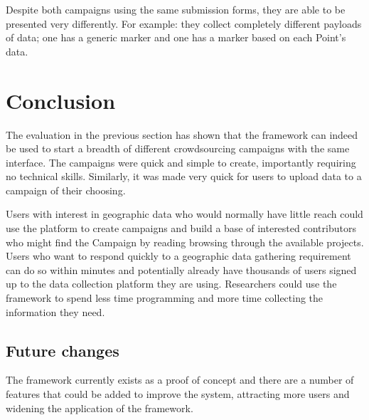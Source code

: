 \documentclass{article}
\newcommand\ssection{\clearpage\section}
\begin{document}
		Despite both campaigns using the same submission forms, they are able to be presented very differently. For example: they collect completely different payloads of data; one has a generic marker and one has a marker based on each Point's data.

	\ssection{Conclusion}
	\label{sec:conclusion}

		The evaluation in the previous section has shown that the framework can indeed be used to start a breadth of different crowdsourcing campaigns with the same interface. The campaigns were quick and simple to create, importantly requiring no technical skills. Similarly, it was made very quick for users to upload data to a campaign of their choosing.

		Users with interest in geographic data who would normally have little reach could use the platform to create campaigns and build a base of interested contributors who might find the Campaign by reading browsing through the available projects. Users who want to respond quickly to a geographic data gathering requirement can do so within minutes and potentially already have thousands of users signed up to the data collection platform they are using. Researchers could use the framework to spend less time programming and more time collecting the information they need.

		\subsection{Future changes}

		The framework currently exists as a proof of concept and there are a number of features that could be added to improve the system, attracting more users and widening the application of the framework.
\end{document}
